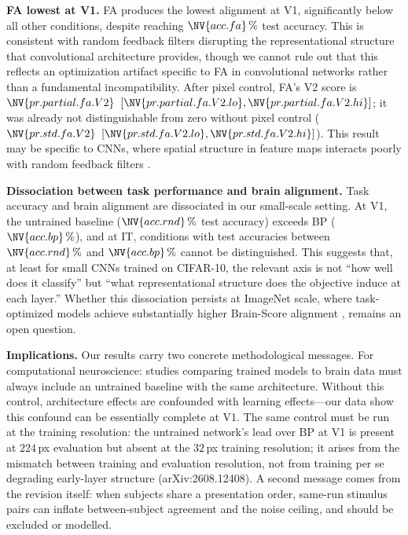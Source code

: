 \documentclass[10pt,twocolumn]{article}
\newcommand{\newid}{arXiv:2608.12408}
\begin{document}
\textbf{FA lowest at V1.} FA produces the lowest alignment at V1, significantly below all other conditions, despite reaching $\NV{acc.fa}\,\%$ test accuracy. This is consistent with random feedback filters disrupting the representational structure that convolutional architecture provides, though we cannot rule out that this reflects an optimization artifact specific to FA in convolutional networks rather than a fundamental incompatibility. After pixel control, FA's V2 score is $\NV{pr.partial.fa.V2}$ $[\NV{pr.partial.fa.V2.lo},\NV{pr.partial.fa.V2.hi}]$; it was already not distinguishable from zero without pixel control ($\NV{pr.std.fa.V2}$ $[\NV{pr.std.fa.V2.lo},\NV{pr.std.fa.V2.hi}]$). This result may be specific to CNNs, where spatial structure in feature maps interacts poorly with random feedback filters \citep{lillicrap2016}.

\textbf{Dissociation between task performance and brain alignment.} Task accuracy and brain alignment are dissociated in our small-scale setting. At V1, the untrained baseline ($\NV{acc.rnd}\,\%$ test accuracy) exceeds BP ($\NV{acc.bp}\,\%$), and at IT, conditions with test accuracies between $\NV{acc.rnd}\,\%$ and $\NV{acc.bp}\,\%$ cannot be distinguished. This suggests that, at least for small CNNs trained on CIFAR-10, the relevant axis is not ``how well does it classify'' but ``what representational structure does the objective induce at each layer.'' Whether this dissociation persists at ImageNet scale, where task-optimized models achieve substantially higher Brain-Score alignment \citep{schrimpf2020}, remains an open question.

\textbf{Implications.} Our results carry two concrete methodological messages. For computational neuroscience: studies comparing trained models to brain data must always include an untrained baseline with the same architecture. Without this control, architecture effects are confounded with learning effects---our data show this confound can be essentially complete at V1. The same control must be run at the training resolution: the untrained network's lead over BP at V1 is present at $224$\,px evaluation but absent at the $32$\,px training resolution; it arises from the mismatch between training and evaluation resolution, not from training per se degrading early-layer structure (\newid). A second message comes from the revision itself: when subjects share a presentation order, same-run stimulus pairs can inflate between-subject agreement and the noise ceiling, and should be excluded or modelled.
\end{document}
